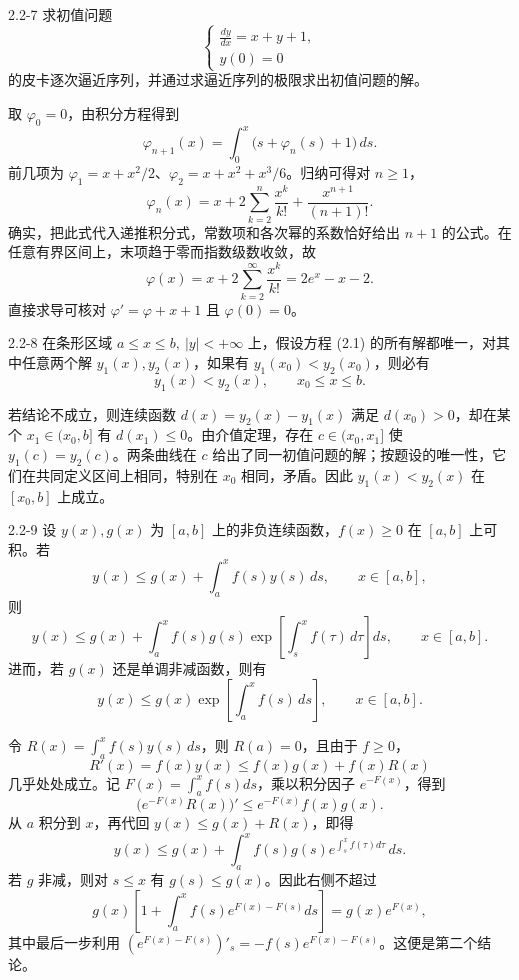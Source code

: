 \documentclass[UTF8,a4paper,11pt]{ctexart}
\begin{document}
\begin{problem}{2.2-7}
求初值问题
  \[
  \begin{cases}
    \displaystyle \frac{dy}{dx}=x+y+1,\\
    y(0)=0
  \end{cases}
  \]
  的皮卡逐次逼近序列，并通过求逼近序列的极限求出初值问题的解。
\end{problem}

\begin{solution}
取 $\varphi_0=0$，由积分方程得到
\[
\varphi_{n+1}(x)=\int_0^x\bigl(s+\varphi_n(s)+1\bigr)\,ds.
\]
前几项为 $\varphi_1=x+x^2/2$、$\varphi_2=x+x^2+x^3/6$。归纳可得对 $n\ge1$，
\[
\boxed{\varphi_n(x)=x+2\sum_{k=2}^{n}\frac{x^k}{k!}+\frac{x^{n+1}}{(n+1)!}}.
\]
确实，把此式代入递推积分式，常数项和各次幂的系数恰好给出 $n+1$ 的公式。在任意有界区间上，末项趋于零而指数级数收敛，故
\[
\varphi(x)=x+2\sum_{k=2}^{\infty}\frac{x^k}{k!}
=\boxed{2e^x-x-2}.
\]
直接求导可核对 $\varphi'=\varphi+x+1$ 且 $\varphi(0)=0$。
\end{solution}

\begin{problem}{2.2-8}
在条形区域 $a\le x\le b,\ |y|<+\infty$ 上，假设方程 (2.1) 的所有解都唯一，对其中任意两个解 $y_1(x),y_2(x)$，如果有 $y_1(x_0)<y_2(x_0)$，则必有
  \[
    y_1(x)<y_2(x),\qquad x_0\le x\le b.
  \]
\end{problem}

\begin{solution}
若结论不成立，则连续函数 $d(x)=y_2(x)-y_1(x)$ 满足 $d(x_0)>0$，却在某个 $x_1\in(x_0,b]$ 有 $d(x_1)\le0$。由介值定理，存在 $c\in(x_0,x_1]$ 使 $y_1(c)=y_2(c)$。两条曲线在 $c$ 给出了同一初值问题的解；按题设的唯一性，它们在共同定义区间上相同，特别在 $x_0$ 相同，矛盾。因此 $y_1(x)<y_2(x)$ 在 $[x_0,b]$ 上成立。
\end{solution}

\begin{problem}{2.2-9}
设 $y(x),g(x)$ 为 $[a,b]$ 上的非负连续函数，$f(x)\ge0$ 在 $[a,b]$ 上可积。若
  \[
    y(x)\le g(x)+\int_a^x f(s)y(s)\,ds,\qquad x\in[a,b],
  \]
  则
  \[
    y(x)\le g(x)+\int_a^x f(s)g(s)
    \exp\!\left[\int_s^x f(\tau)\,d\tau\right]ds,\qquad x\in[a,b].
  \]
  进而，若 $g(x)$ 还是单调非减函数，则有
  \[
    y(x)\le g(x)\exp\!\left[\int_a^x f(s)\,ds\right],\qquad x\in[a,b].
  \]
\end{problem}

\begin{solution}
令 $R(x)=\int_a^x f(s)y(s)\,ds$，则 $R(a)=0$，且由于 $f\ge0$，
\[
R'(x)=f(x)y(x)\le f(x)g(x)+f(x)R(x)
\]
几乎处处成立。记 $F(x)=\int_a^x f(s)ds$，乘以积分因子 $e^{-F(x)}$，得到
\[
\bigl(e^{-F(x)}R(x)\bigr)'\le e^{-F(x)}f(x)g(x).
\]
从 $a$ 积分到 $x$，再代回 $y(x)\le g(x)+R(x)$，即得
\[
\boxed{y(x)\le g(x)+\int_a^x f(s)g(s)
e^{\int_s^x f(\tau)d\tau}\,ds}.
\]
若 $g$ 非减，则对 $s\le x$ 有 $g(s)\le g(x)$。因此右侧不超过
\[
g(x)\left[1+\int_a^x f(s)e^{F(x)-F(s)}ds\right]
=g(x)e^{F(x)},
\]
其中最后一步利用 $(e^{F(x)-F(s)})'_{s}=-f(s)e^{F(x)-F(s)}$。这便是第二个结论。
\end{solution}
\end{document}
